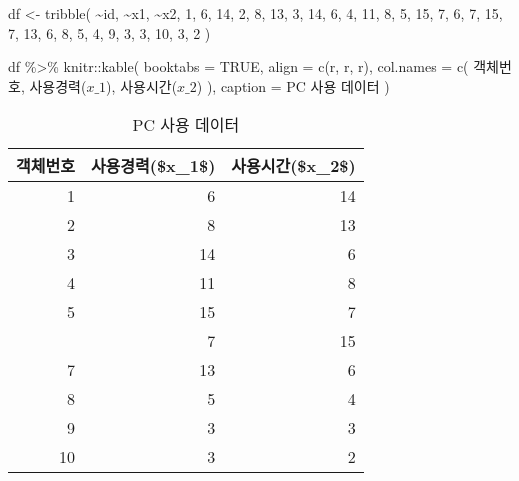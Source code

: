 \documentclass[
]{book}
\newenvironment{Shaded}{\begin{snugshade}}{\end{snugshade}}
\newcommand{\AttributeTok}[1]{\textcolor[rgb]{0.77,0.63,0.00}{#1}}
\newcommand{\ConstantTok}[1]{\textcolor[rgb]{0.00,0.00,0.00}{#1}}
\newcommand{\DecValTok}[1]{\textcolor[rgb]{0.00,0.00,0.81}{#1}}
\newcommand{\FunctionTok}[1]{\textcolor[rgb]{0.00,0.00,0.00}{#1}}
\newcommand{\NormalTok}[1]{#1}
\newcommand{\OtherTok}[1]{\textcolor[rgb]{0.56,0.35,0.01}{#1}}
\newcommand{\SpecialCharTok}[1]{\textcolor[rgb]{0.00,0.00,0.00}{#1}}
\newcommand{\StringTok}[1]{\textcolor[rgb]{0.31,0.60,0.02}{#1}}
\begin{document}
\begin{Shaded}
\begin{Highlighting}[]
\NormalTok{df }\OtherTok{\textless{}{-}} \FunctionTok{tribble}\NormalTok{(}
  \SpecialCharTok{\textasciitilde{}}\NormalTok{id, }\SpecialCharTok{\textasciitilde{}}\NormalTok{x1, }\SpecialCharTok{\textasciitilde{}}\NormalTok{x2,}
  \DecValTok{1}\NormalTok{, }\DecValTok{6}\NormalTok{, }\DecValTok{14}\NormalTok{,}
  \DecValTok{2}\NormalTok{, }\DecValTok{8}\NormalTok{, }\DecValTok{13}\NormalTok{,}
  \DecValTok{3}\NormalTok{, }\DecValTok{14}\NormalTok{, }\DecValTok{6}\NormalTok{,}
  \DecValTok{4}\NormalTok{, }\DecValTok{11}\NormalTok{, }\DecValTok{8}\NormalTok{,}
  \DecValTok{5}\NormalTok{, }\DecValTok{15}\NormalTok{, }\DecValTok{7}\NormalTok{,}
  \DecValTok{6}\NormalTok{, }\DecValTok{7}\NormalTok{, }\DecValTok{15}\NormalTok{,}
  \DecValTok{7}\NormalTok{, }\DecValTok{13}\NormalTok{, }\DecValTok{6}\NormalTok{,}
  \DecValTok{8}\NormalTok{, }\DecValTok{5}\NormalTok{, }\DecValTok{4}\NormalTok{,}
  \DecValTok{9}\NormalTok{, }\DecValTok{3}\NormalTok{, }\DecValTok{3}\NormalTok{,}
  \DecValTok{10}\NormalTok{, }\DecValTok{3}\NormalTok{, }\DecValTok{2}
\NormalTok{)}

\NormalTok{df }\SpecialCharTok{\%\textgreater{}\%}
\NormalTok{  knitr}\SpecialCharTok{::}\FunctionTok{kable}\NormalTok{(}
    \AttributeTok{booktabs =} \ConstantTok{TRUE}\NormalTok{,}
    \AttributeTok{align =} \FunctionTok{c}\NormalTok{(}\StringTok{\textquotesingle{}r\textquotesingle{}}\NormalTok{, }\StringTok{\textquotesingle{}r\textquotesingle{}}\NormalTok{, }\StringTok{\textquotesingle{}r\textquotesingle{}}\NormalTok{),}
    \AttributeTok{col.names =} \FunctionTok{c}\NormalTok{(}
      \StringTok{\textquotesingle{}객체번호\textquotesingle{}}\NormalTok{, }
      \StringTok{\textquotesingle{}사용경력($x\_1$)\textquotesingle{}}\NormalTok{, }\StringTok{\textquotesingle{}사용시간($x\_2$)\textquotesingle{}}
\NormalTok{      ),}
    \AttributeTok{caption =} \StringTok{\textquotesingle{}PC 사용 데이터\textquotesingle{}}
\NormalTok{  )}
\end{Highlighting}
\end{Shaded}

\begin{table}

\caption{\label{tab:kmeans-train-data}PC 사용 데이터}
\centering
\begin{tabular}[t]{rrr}
\toprule
객체번호 & 사용경력(\$x\_1\$) & 사용시간(\$x\_2\$)\\
\midrule
1 & 6 & 14\\
2 & 8 & 13\\
3 & 14 & 6\\
4 & 11 & 8\\
5 & 15 & 7\\
\addlinespace
6 & 7 & 15\\
7 & 13 & 6\\
8 & 5 & 4\\
9 & 3 & 3\\
10 & 3 & 2\\
\bottomrule
\end{tabular}
\end{table}
\end{document}
